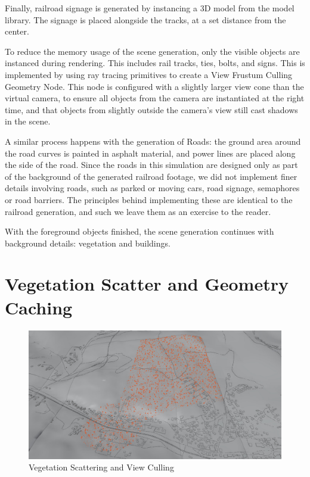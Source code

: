 Finally, railroad signage is generated by instancing a 3D model from the model library. The signage is placed alongside the tracks, at a set distance from the center.

To reduce the memory usage of the scene generation, only the visible objects are instanced during rendering. This includes rail tracks, ties, bolts, and signs. This is implemented by using ray tracing primitives to create a View Frustum Culling Geometry Node. This node is configured with a slightly larger view cone than the virtual camera, to ensure all objects from the camera are instantiated at the right time, and that objects from slightly outside the camera's view still cast shadows in the scene.


A similar process happens with the generation of Roads: the ground area around the road curves is painted in asphalt material, and power lines are placed along the side of the road. Since the roads in this simulation are designed only as part of the background of the generated railroad footage, we did not implement finer details involving roads, such as parked or moving cars, road signage, semaphores or road barriers. The principles behind implementing these are identical to the railroad generation, and such we leave them as an exercise to the reader.


With the foreground objects finished, the scene generation continues with background details: vegetation and buildings.

\section{Vegetation Scatter and Geometry Caching}
\label{sec:vegetation-scatter}

\begin{figure}[H]
    \centering
    \includegraphics[width=.95\textwidth]{src/img/vegetation/5-trees-culling-result.jpg}
    \caption{Vegetation Scattering and View Culling}
    \label{fig:veg-final-result}
\end{figure}

